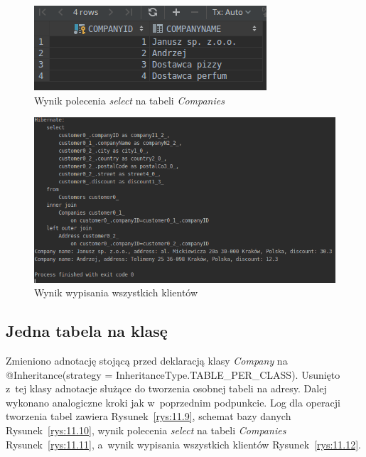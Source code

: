 \documentclass[12pt, a4paper]{mwart}
\begin{document}
\begin{figure}[ht]
  \centering
  \includegraphics[scale=0.5]{XI/11-7.png}
  \caption{Wynik polecenia \textit{select} na tabeli \textit{Companies}}
  \label{rys:11.7}
\end{figure}

\begin{figure}[ht]
  \centering
  \includegraphics[scale=0.5]{XI/11-8.png}
  \caption{Wynik wypisania wszystkich klientów}
  \label{rys:11.8}
\end{figure}

\clearpage
\subsection{Jedna tabela na klasę}

Zmieniono adnotację stojącą przed deklaracją klasy \textit{Company} na @Inheritance(strategy = InheritanceType.TABLE\_PER\_CLASS). Usunięto z~tej klasy adnotacje służące do tworzenia osobnej tabeli na adresy. Dalej wykonano analogiczne kroki jak w~poprzednim podpunkcie. Log dla operacji tworzenia tabel zawiera Rysunek~\ref{rys:11.9}, schemat bazy danych Rysunek~\ref{rys:11.10}, wynik polecenia \textit{select} na tabeli \textit{Companies} Rysunek~\ref{rys:11.11}, a~wynik wypisania wszystkich klientów Rysunek~\ref{rys:11.12}.
\end{document}
